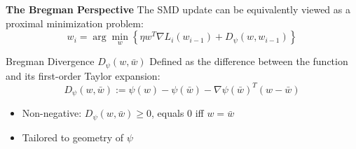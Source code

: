 \documentclass[aspectratio=169]{beamer}
\begin{document}
\begin{frame}{\textcolor{cmindsblue}{\textbf{The Bregman Perspective}}}
    The SMD update can be equivalently viewed as a proximal minimization problem:
    \begin{equation}
        w_i = \arg\min_{w} \left\{ \eta w^T \nabla L_i(w_{i-1}) + D_\psi(w, w_{i-1}) \right\}
    \end{equation}

    \begin{block}{Bregman Divergence $D_\psi(w, \bar{w})$}
        Defined as the difference between the function and its first-order Taylor expansion:
        \begin{equation}
            D_\psi(w, \bar{w}) := \psi(w) - \psi(\bar{w}) - \nabla\psi(\bar{w})^T(w - \bar{w})
        \end{equation}
    \end{block}

    \begin{itemize}
        \item Non-negative: $D_\psi(w, \bar{w}) \geq 0$, equals 0 iff $w = \bar{w}$
        \item Tailored to geometry of $\psi$
    \end{itemize}
\end{frame}

\end{document}
